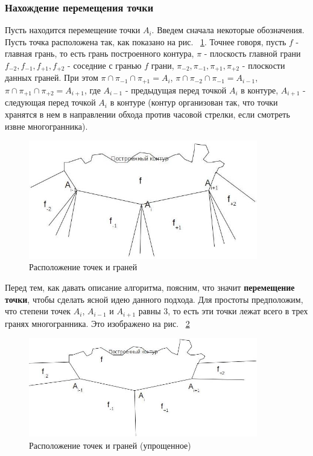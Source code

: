 \documentclass[a4paper,12pt, titlepage]{article}
\begin{document}
\subsubsection{Нахождение перемещения точки}
\begin{flushleft}
 Пусть находится перемещение точки $A_{i}$. Введем сначала некоторые обозначения. Пусть точка расположена
так, как показано на рис. ~\ref{pic-step-1}. Точнее говоря, пусть $f$ - главная грань, то есть грань 
построенного контура, $\pi$ - плоскость главной грани $f_{-2}, f_{-1}, f_{+1}, f_{+2}$ - соседние 
с гранью $f$ грани, $\pi_{-2}, \pi_{-1}, \pi_{+1}, \pi_{+2}$ - плоскости данных граней. При этом 
$\pi \cap \pi_{-1} \cap \pi_{+1} = A_{i}$, $\pi \cap \pi_{-2} \cap \pi_{-1} = A_{i-1}$,
$\pi \cap \pi_{+1} \cap \pi_{+2} = A_{i+1}$, где $A_{i - 1}$ - предыдущая перед точкой $A_{i}$ в контуре,
$A_{i + 1}$ - следующая перед точкой $A_{i}$ в контуре (контур организован так, что точки хранятся в нем
в направлении обхода против часовой стрелки, если смотреть извне многогранника).
\end{flushleft}
\begin{flushleft}
  \begin{figure}[ht]
    \includegraphics[clip, width=10cm]{img/pic-step-1.jpg}
    \caption{Расположение точек и граней}\label{pic-step-1}
  \end{figure}
\end{flushleft}
\begin{flushleft}
 Перед тем, как давать описание алгоритма, поясним, что значит \textbf{перемещение точки}, чтобы сделать
ясной идею данного подхода. Для простоты предположим, что степени точек $A_{i}$, $A_{i - 1}$ и $A_{i + 1}$
равны 3, то есть эти точки лежат всего в трех гранях многогранника. Это изображено на рис.
~\ref{pic-step-2}
\end{flushleft}
\begin{flushleft}
  \begin{figure}[ht]
    \includegraphics[clip, width=10cm]{img/pic-step-2.jpg}
    \caption{Расположение точек и граней (упрощенное)}\label{pic-step-2}
  \end{figure}
\end{flushleft}
\end{document}
